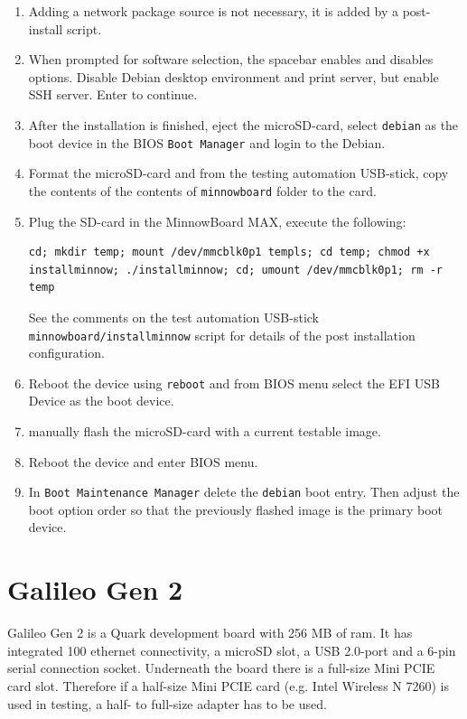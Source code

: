 \documentclass[a4paper,11pt]{article}
\newcommand{\cmd}[1]{\texttt{#1}}
\begin{document}
\begin{enumerate}
\item Adding a network package source is not necessary, it is added by a post-install script.

\item When prompted for software selection, the spacebar enables and disables options. Disable Debian desktop environment and print server, but enable SSH server. Enter to continue.

\item After the installation is finished, eject the microSD-card, select \cmd{debian} as the boot device in the BIOS \cmd{Boot Manager} and login to the Debian.

\item Format the microSD-card and from the testing automation USB-stick, copy the contents of the contents of \cmd{minnowboard} folder to the card.

\item Plug the SD-card in the MinnowBoard MAX, execute the following:
\begin{lstlisting}
cd; mkdir temp; mount /dev/mmcblk0p1 templs; cd temp; chmod +x installminnow; ./installminnow; cd; umount /dev/mmcblk0p1; rm -r temp
\end{lstlisting}

See the comments on the test automation USB-stick \cmd{minnowboard/installminnow} script for details of the post installation configuration.

\item Reboot the device using \cmd{reboot} and from BIOS menu select the EFI USB Device as the boot device.

\item manually flash the microSD-card with a current testable image.

\item Reboot the device and enter BIOS menu.

\item In \cmd{Boot Maintenance Manager} delete the \cmd{debian} boot entry. Then adjust the boot option order so that the previously flashed image is the primary boot device.
\end{enumerate}

\section{Galileo Gen 2}
\label{galileo}

Galileo Gen 2 is a Quark development board with 256 MB of ram. It has integrated 100 ethernet connectivity, a microSD slot, a USB 2.0-port and a 6-pin serial connection socket. Underneath the board there is a full-size Mini PCIE card slot. Therefore if a half-size Mini PCIE card (e.g. Intel Wireless N 7260) is used in testing, a half- to full-size adapter has to be used.
\end{document}
